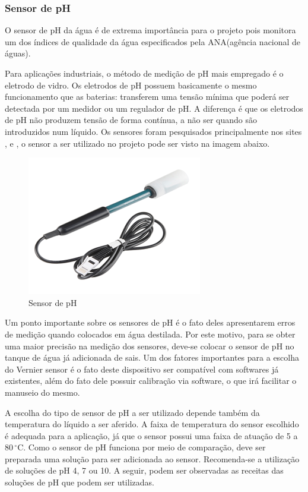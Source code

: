 \subsubsection{Sensor de pH}
O sensor de pH da água é de extrema importância para o projeto  pois monitora um dos índices de qualidade da água especificados pela ANA(agência nacional de águas). 

Para aplicações industriais, o método de medição de pH mais empregado é o eletrodo de vidro. Os eletrodos de pH possuem basicamente o mesmo funcionamento que as baterias: transferem uma tensão mínima que poderá ser detectada por um medidor ou um regulador de pH. A diferença é que os eletrodos de pH não produzem tensão de forma contínua, a não ser quando são introduzidos num líquido. Os sensores foram pesquisados principalmente nos sites \footnotemark {}, \footnotemark {} e \footnotemark {}, o sensor a ser utilizado no projeto pode ser visto na imagem abaixo. 
	\begin{figure}[!htbp]
	  \centering
	  \includegraphics[scale=0.8]{editaveis/figuras/sensor_ph}
	  \caption[Sensor de pH]{Sensor de pH}
	  \label{sensor_ph}
	\end{figure}
	\FloatBarrier
Um ponto importante sobre os sensores de pH é o fato deles apresentarem erros de medição quando colocados em água destilada. Por este motivo, para se obter uma maior precisão na medição dos sensores, deve-se colocar o sensor de pH no tanque de água já adicionada de sais. Um dos fatores importantes para a escolha do Vernier sensor é o fato deste dispositivo ser compatível com softwares já existentes, além do fato dele possuir calibração via software, o que irá facilitar o manuseio do mesmo.

	A escolha do tipo de sensor de pH a ser utilizado depende também da temperatura do líquido a ser aferido. A faixa de temperatura do sensor escolhido é adequada para a aplicação, já que o sensor possui uma faixa de atuação de 5 a $80\,^{\circ}\mathrm{C}$. Como o sensor de pH funciona por meio de comparação, deve ser preparada uma solução para ser adicionada ao sensor. Recomenda-se a utilização de soluções de pH 4, 7 ou 10. A seguir, podem ser observadas as receitas das soluções de pH que podem ser utilizadas.


